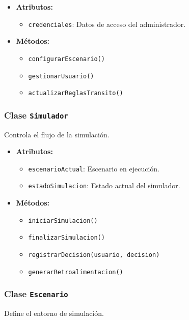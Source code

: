 \documentclass[12pt]{article}
\begin{document}
\begin{itemize}
    \item \textbf{Atributos:}
    \begin{itemize}
        \item \texttt{credenciales}: Datos de acceso del administrador.
    \end{itemize}
    \item \textbf{Métodos:}
    \begin{itemize}
        \item \texttt{configurarEscenario()}
        \item \texttt{gestionarUsuario()}
        \item \texttt{actualizarReglasTransito()}
    \end{itemize}
\end{itemize}

\subsubsection*{Clase \texttt{Simulador}}
Controla el flujo de la simulación.

\begin{itemize}
    \item \textbf{Atributos:}
    \begin{itemize}
        \item \texttt{escenarioActual}: Escenario en ejecución.
        \item \texttt{estadoSimulacion}: Estado actual del simulador.
    \end{itemize}
    \item \textbf{Métodos:}
    \begin{itemize}
        \item \texttt{iniciarSimulacion()}
        \item \texttt{finalizarSimulacion()}
        \item \texttt{registrarDecision(usuario, decision)}
        \item \texttt{generarRetroalimentacion()}
    \end{itemize}
\end{itemize}

\subsubsection*{Clase \texttt{Escenario}}
Define el entorno de simulación.
\end{document}
